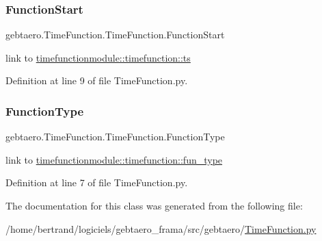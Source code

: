 \subsubsection{\texorpdfstring{Function\+Start}{FunctionStart}}
{\footnotesize\ttfamily gebtaero.\+Time\+Function.\+Time\+Function.\+Function\+Start}



link to \hyperlink{structtimefunctionmodule_1_1timefunction_a62e761e489833d17dcd1dbcac5c1dfd6}{timefunctionmodule\+::timefunction\+::ts} 



Definition at line 9 of file Time\+Function.\+py.

\mbox{\label{classgebtaero_1_1_time_function_1_1_time_function_a71eb6968c49304736305aee5c1e37d51}} 
\subsubsection{\texorpdfstring{Function\+Type}{FunctionType}}
{\footnotesize\ttfamily gebtaero.\+Time\+Function.\+Time\+Function.\+Function\+Type}



link to \hyperlink{structtimefunctionmodule_1_1timefunction_acd580915b25f29aa47c58467c394d2f4}{timefunctionmodule\+::timefunction\+::fun\+\_\+type} 



Definition at line 7 of file Time\+Function.\+py.



The documentation for this class was generated from the following file\+:\begin{DoxyCompactItemize}
\item 
/home/bertrand/logiciels/gebtaero\+\_\+frama/src/gebtaero/\hyperlink{_time_function_8py}{Time\+Function.\+py}\end{DoxyCompactItemize}
